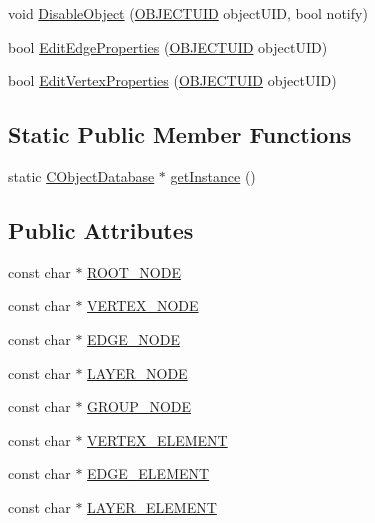 \begin{DoxyCompactItemize}
\item 
void \hyperlink{class_c_object_database_a7f90d1319bf941561d563bbd4ef0d0fb}{Disable\+Object} (\hyperlink{_object_database_defines_8h_a164ec120b01429b93c9cd0bef2a67e64}{O\+B\+J\+E\+C\+T\+U\+I\+D} object\+U\+I\+D, bool notify)
\item 
bool \hyperlink{class_c_object_database_a4ba55f0f2719dad828feb48767e282d8}{Edit\+Edge\+Properties} (\hyperlink{_object_database_defines_8h_a164ec120b01429b93c9cd0bef2a67e64}{O\+B\+J\+E\+C\+T\+U\+I\+D} object\+U\+I\+D)
\item 
bool \hyperlink{class_c_object_database_a75bcb8391778808649d5c3a32b33ab95}{Edit\+Vertex\+Properties} (\hyperlink{_object_database_defines_8h_a164ec120b01429b93c9cd0bef2a67e64}{O\+B\+J\+E\+C\+T\+U\+I\+D} object\+U\+I\+D)
\end{DoxyCompactItemize}
\subsection*{Static Public Member Functions}
\begin{DoxyCompactItemize}
\item 
static \hyperlink{class_c_object_database}{C\+Object\+Database} $\ast$ \hyperlink{class_c_object_database_afa1bffc3892eb582b8017b582e445071}{get\+Instance} ()
\end{DoxyCompactItemize}
\subsection*{Public Attributes}
\begin{DoxyCompactItemize}
\item 
const char $\ast$ \hyperlink{class_c_object_database_af5c011e783985858f571b07750298936}{R\+O\+O\+T\+\_\+\+N\+O\+D\+E}
\item 
const char $\ast$ \hyperlink{class_c_object_database_a23d016284e7c7d76a10b2e50d132711a}{V\+E\+R\+T\+E\+X\+\_\+\+N\+O\+D\+E}
\item 
const char $\ast$ \hyperlink{class_c_object_database_a02d47c62bb58cced09ded02772773f9d}{E\+D\+G\+E\+\_\+\+N\+O\+D\+E}
\item 
const char $\ast$ \hyperlink{class_c_object_database_a4cf4f0714a05dccfabfacaf0694b22e4}{L\+A\+Y\+E\+R\+\_\+\+N\+O\+D\+E}
\item 
const char $\ast$ \hyperlink{class_c_object_database_a36329774e26fac45fa4e7d691a1b6b63}{G\+R\+O\+U\+P\+\_\+\+N\+O\+D\+E}
\item 
const char $\ast$ \hyperlink{class_c_object_database_a965cae785a3f37147b579146f339a7de}{V\+E\+R\+T\+E\+X\+\_\+\+E\+L\+E\+M\+E\+N\+T}
\item 
const char $\ast$ \hyperlink{class_c_object_database_a0f14765279c94010464f24192f762fd0}{E\+D\+G\+E\+\_\+\+E\+L\+E\+M\+E\+N\+T}
\item 
const char $\ast$ \hyperlink{class_c_object_database_aa46e1fcbe98cd370a678c0379da2f5e4}{L\+A\+Y\+E\+R\+\_\+\+E\+L\+E\+M\+E\+N\+T}
\end{DoxyCompactItemize}


